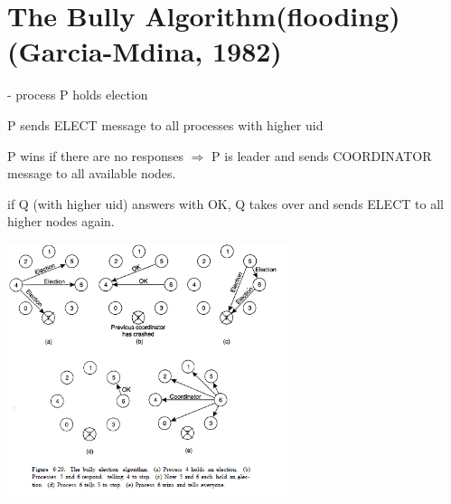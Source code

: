 \section{The Bully Algorithm(flooding) (Garcia-Mdina, 1982)}
- process P holds election
\begin{compactenum}
\item P sends ELECT message to all processes with higher uid
\item P wins if there are no responses $\Rightarrow$ P is leader and sends COORDINATOR message to all available nodes.
\item if Q (with higher uid) answers with OK, Q takes over and sends ELECT to all higher nodes again.
\end{compactenum}

\begin{minipage}{\linewidth}
	\centering\includegraphics[width=310px]{gfx/leader1.png}
	\label{img:leader1}
\end{minipage}

